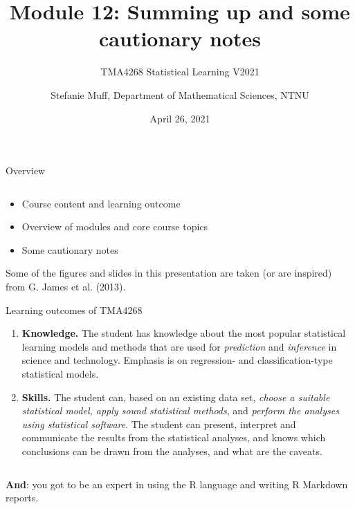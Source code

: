 \documentclass[10pt,ignorenonframetext,]{beamer}
\title{Module 12: Summing up and some cautionary notes}
\subtitle{TMA4268 Statistical Learning V2021}
\author{Stefanie Muff, Department of Mathematical Sciences, NTNU}
\date{April 26, 2021}
\begin{document}
\frame{\titlepage}

\begin{frame}{Overview}
\protect\hypertarget{overview}{}

\(~\)

\begin{itemize}
\item
  Course content and learning outcome \vspace{2mm}
\item
  Overview of modules and core course topics \vspace{2mm}
\item
  Some cautionary notes
\end{itemize}

\end{frame}

\begin{frame}

Some of the figures and slides in this presentation are taken (or are
inspired) from G. James et al. (2013).

\end{frame}

\begin{frame}{Learning outcomes of TMA4268}
\protect\hypertarget{learning-outcomes-of-tma4268}{}

\begin{enumerate}
\item
  \textbf{Knowledge.} The student has knowledge about the most popular
  statistical learning models and methods that are used for
  \emph{prediction} and \emph{inference} in science and technology.
  Emphasis is on regression- and classification-type statistical models.
\item
  \textbf{Skills.} The student can, based on an existing data set,
  \emph{choose a suitable statistical model, apply sound statistical
  methods}, and \emph{perform the analyses using statistical software}.
  The student can present, interpret and communicate the results from
  the statistical analyses, and knows which conclusions can be drawn
  from the analyses, and what are the caveats.
\end{enumerate}

\(~\)

\textbf{And}: you got to be an expert in using the R language and
writing R Markdown reports.

\end{frame}
\end{document}
